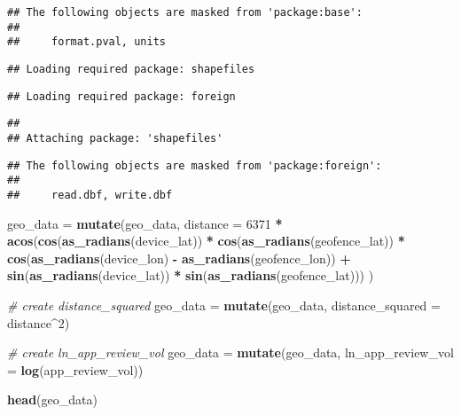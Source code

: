 \documentclass[]{article}
\newenvironment{Shaded}{\begin{snugshade}}{\end{snugshade}}
\newcommand{\KeywordTok}[1]{\textcolor[rgb]{0.13,0.29,0.53}{\textbf{#1}}}
\newcommand{\DataTypeTok}[1]{\textcolor[rgb]{0.13,0.29,0.53}{#1}}
\newcommand{\DecValTok}[1]{\textcolor[rgb]{0.00,0.00,0.81}{#1}}
\newcommand{\StringTok}[1]{\textcolor[rgb]{0.31,0.60,0.02}{#1}}
\newcommand{\CommentTok}[1]{\textcolor[rgb]{0.56,0.35,0.01}{\textit{#1}}}
\newcommand{\OperatorTok}[1]{\textcolor[rgb]{0.81,0.36,0.00}{\textbf{#1}}}
\newcommand{\NormalTok}[1]{#1}
\begin{document}
\begin{verbatim}
## The following objects are masked from 'package:base':
## 
##     format.pval, units
\end{verbatim}

\begin{verbatim}
## Loading required package: shapefiles
\end{verbatim}

\begin{verbatim}
## Loading required package: foreign
\end{verbatim}

\begin{verbatim}
## 
## Attaching package: 'shapefiles'
\end{verbatim}

\begin{verbatim}
## The following objects are masked from 'package:foreign':
## 
##     read.dbf, write.dbf
\end{verbatim}

\begin{Shaded}
\begin{Highlighting}[]
\NormalTok{geo_data =}\StringTok{ }\KeywordTok{mutate}\NormalTok{(geo_data, }\DataTypeTok{distance =} \DecValTok{6371} \OperatorTok{*}\StringTok{ }\KeywordTok{acos}\NormalTok{(}\KeywordTok{cos}\NormalTok{(}\KeywordTok{as_radians}\NormalTok{(device_lat)) }\OperatorTok{*}\StringTok{ }
\StringTok{                    }\KeywordTok{cos}\NormalTok{(}\KeywordTok{as_radians}\NormalTok{(geofence_lat)) }\OperatorTok{*}\StringTok{ }\KeywordTok{cos}\NormalTok{(}\KeywordTok{as_radians}\NormalTok{(device_lon) }\OperatorTok{-}\StringTok{ }\KeywordTok{as_radians}\NormalTok{(geofence_lon)) }
                    \OperatorTok{+}\StringTok{ }\KeywordTok{sin}\NormalTok{(}\KeywordTok{as_radians}\NormalTok{(device_lat)) }\OperatorTok{*}\StringTok{ }\KeywordTok{sin}\NormalTok{(}\KeywordTok{as_radians}\NormalTok{(geofence_lat))) )}

\CommentTok{# create distance_squared}
\NormalTok{geo_data =}\StringTok{ }\KeywordTok{mutate}\NormalTok{(geo_data, }\DataTypeTok{distance_squared =}\NormalTok{ distance}\OperatorTok{^}\DecValTok{2}\NormalTok{)}

\CommentTok{# create ln_app_review_vol}
\NormalTok{geo_data =}\StringTok{ }\KeywordTok{mutate}\NormalTok{(geo_data, }\DataTypeTok{ln_app_review_vol =} \KeywordTok{log}\NormalTok{(app_review_vol))}

\KeywordTok{head}\NormalTok{(geo_data)}
\end{Highlighting}
\end{Shaded}
\end{document}
